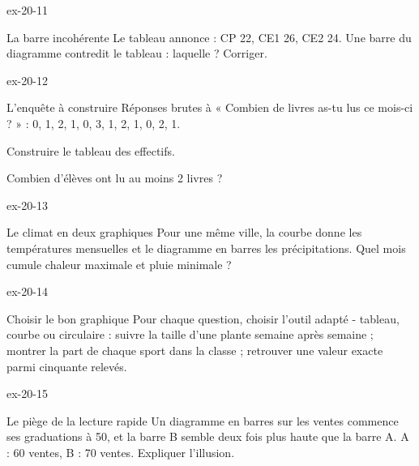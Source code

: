 \begin{blocLivre}{ex-20-11}\begin{exercice}[3]{La barre incohérente}
Le tableau annonce : CP 22, CE1 26, CE2 24. Une barre du diagramme contredit le tableau : laquelle ? Corriger.
\label{fig-ex-20-11}
\end{exercice}\end{blocLivre}
\begin{blocLivre}{ex-20-12}\begin{exercice}[3]{L’enquête à construire}
Réponses brutes à « Combien de livres as-tu lus ce mois-ci ? » : 0, 1, 2, 1, 0, 3, 1, 2, 1, 0, 2, 1.\begin{questions}
\item Construire le tableau des effectifs.
\item Combien d’élèves ont lu au moins 2 livres ?
\end{questions}
\end{exercice}\end{blocLivre}
\begin{blocLivre}{ex-20-13}\begin{exercice}[3]{Le climat en deux graphiques}
Pour une même ville, la courbe donne les températures mensuelles et le diagramme en barres les précipitations. Quel mois cumule chaleur maximale et pluie minimale ?
\label{fig-ex-20-13}
\end{exercice}\end{blocLivre}
\begin{blocLivre}{ex-20-14}\begin{exercice}[3]{Choisir le bon graphique}
Pour chaque question, choisir l’outil adapté - tableau, courbe ou circulaire : suivre la taille d’une plante semaine après semaine ; montrer la part de chaque sport dans la classe ; retrouver une valeur exacte parmi cinquante relevés.
\end{exercice}\end{blocLivre}
\begin{blocLivre}{ex-20-15}\begin{exercice}[3]{Le piège de la lecture rapide}
Un diagramme en barres sur les ventes commence ses graduations à 50, et la barre B semble deux fois plus haute que la barre A. A : 60 ventes, B : 70 ventes. Expliquer l’illusion.
\end{exercice}\end{blocLivre}

\clearpage
